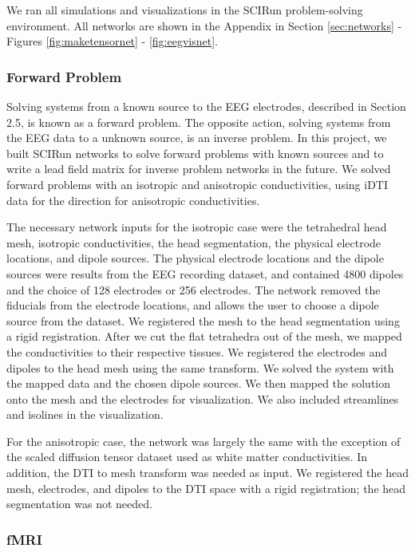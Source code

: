 We ran all simulations and visualizations in the SCIRun problem-solving environment. All networks are shown in the Appendix in Section \ref{sec:networks} - Figures \ref{fig:maketensornet} - \ref{fig:eegvisnet}.

\subsubsection{Forward Problem}

Solving systems from a known source to the EEG electrodes, described in Section 2.5, is known as a forward problem. The opposite action, solving systems from the EEG data to a unknown source, is an inverse problem.  In this project, we built SCIRun networks to solve forward problems with known sources and to write a lead field matrix for inverse problem networks in the future. We solved forward problems with an isotropic and anisotropic conductivities, using iDTI data for the direction for anisotropic conductivities.

The necessary network inputs for the isotropic case were the tetrahedral head mesh, isotropic conductivities, the head segmentation, the physical electrode locations, and dipole sources. The physical electrode locations and the dipole sources were results from the EEG recording dataset, and contained 4800 dipoles and the choice of 128 electrodes or 256 electrodes. The network removed the fiducials from the electrode locations, and allows the user to choose a dipole source from the dataset. We registered the mesh to the head segmentation using a rigid registration. After we cut the flat tetrahedra out of the mesh, we mapped the conductivities to their respective tissues. We registered the electrodes and dipoles to the head mesh using the same transform. We solved the system with the mapped data and the chosen dipole sources. We then mapped the solution onto the mesh and the electrodes for visualization. We also included streamlines and isolines in the visualization.

For the anisotropic case, the network was largely the same with the exception of the scaled diffusion tensor dataset used as white matter conductivities. In addition, the DTI to mesh transform was needed as input. We registered the head mesh, electrodes, and dipoles to the DTI space with a rigid registration; the head segmentation was not needed.

\subsubsection{fMRI}

